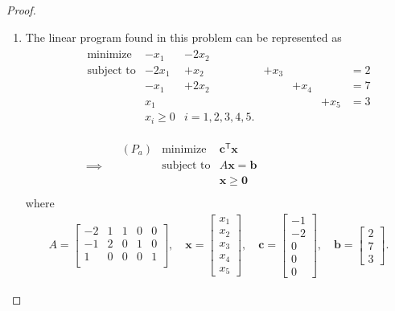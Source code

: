 \documentclass[12pt]{article}
\theoremstyle{definition}
\newcommand{\vc}[1]{\boldsymbol{#1}}
\newcommand{\tran}{\mathsf{T}}
\begin{document}
\begin{proof}
  \begin{enumerate}
    \item The linear program found in this problem can be represented as
      \begin{align*}
        &\begin{array}{rllllll}
          \text{minimize} & -x_1 &- 2x_2 & & & & \\
          \text{subject to} & -2x_1 &+ x_2 &+ x_3 & & &= 2 \\
          & -x_1 &+ 2x_2& &+ x_4 & &= 7 \\
          & x_1 &&& &+ x_5 &= 3 \\
          &x_i \geq 0 & i= 1,2,3,4,5.& & & \\
        \end{array}
        \\ \\
        \quad &\implies \quad
        \begin{array}{rrl}
          (P_a) & \text{minimize} & \vc{c}^\tran\vc{x} \\
          & \text{subject to} & A\vc{x} = \vc{b}  \\
          & & \vc{x} \geq \vc{0} \\
        \end{array}
      \end{align*}
      where
      \begin{align*}
        A = \begin{bmatrix}-2 & 1 & 1 & 0 & 0 \\ -1 & 2 & 0 & 1 & 0 \\ 1 & 0 & 0 & 0 & 1 \\\end{bmatrix},\quad
        \vc{x} = \begin{bmatrix}x_1 \\ x_2 \\ x_3 \\x_4 \\ x_5\end{bmatrix},\quad \vc{c} = \begin{bmatrix}-1 \\ -2 \\ 0 \\ 0 \\ 0\end{bmatrix},\quad \vc{b} = \begin{bmatrix}2 \\ 7 \\ 3\end{bmatrix}.
      \end{align*}


\end{enumerate}
\end{proof}
\end{document}
